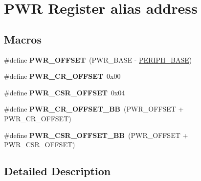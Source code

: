 \hypertarget{group___p_w_r__register__alias__address}{}\section{P\+WR Register alias address}
\label{group___p_w_r__register__alias__address}
\subsection*{Macros}
\begin{DoxyCompactItemize}
\item 
\#define {\bfseries P\+W\+R\+\_\+\+O\+F\+F\+S\+ET}~(P\+W\+R\+\_\+\+B\+A\+SE -\/ \hyperlink{group___peripheral__memory__map_ga9171f49478fa86d932f89e78e73b88b0}{P\+E\+R\+I\+P\+H\+\_\+\+B\+A\+SE})\hypertarget{group___p_w_r__register__alias__address_ga7f88bce73931300319824f22578f90de}{}\label{group___p_w_r__register__alias__address_ga7f88bce73931300319824f22578f90de}

\item 
\#define {\bfseries P\+W\+R\+\_\+\+C\+R\+\_\+\+O\+F\+F\+S\+ET}~0x00\hypertarget{group___p_w_r__register__alias__address_gafc4a9746ee5df183f01c6c9b2b193bf8}{}\label{group___p_w_r__register__alias__address_gafc4a9746ee5df183f01c6c9b2b193bf8}

\item 
\#define {\bfseries P\+W\+R\+\_\+\+C\+S\+R\+\_\+\+O\+F\+F\+S\+ET}~0x04\hypertarget{group___p_w_r__register__alias__address_ga5108a7917314663531d70bdf05ea2698}{}\label{group___p_w_r__register__alias__address_ga5108a7917314663531d70bdf05ea2698}

\item 
\#define {\bfseries P\+W\+R\+\_\+\+C\+R\+\_\+\+O\+F\+F\+S\+E\+T\+\_\+\+BB}~(P\+W\+R\+\_\+\+O\+F\+F\+S\+ET + P\+W\+R\+\_\+\+C\+R\+\_\+\+O\+F\+F\+S\+ET)\hypertarget{group___p_w_r__register__alias__address_ga387e4e883d6bea5c2223adc42ee72daa}{}\label{group___p_w_r__register__alias__address_ga387e4e883d6bea5c2223adc42ee72daa}

\item 
\#define {\bfseries P\+W\+R\+\_\+\+C\+S\+R\+\_\+\+O\+F\+F\+S\+E\+T\+\_\+\+BB}~(P\+W\+R\+\_\+\+O\+F\+F\+S\+ET + P\+W\+R\+\_\+\+C\+S\+R\+\_\+\+O\+F\+F\+S\+ET)\hypertarget{group___p_w_r__register__alias__address_gaa9477acfcacc4610533df164c94ad6fd}{}\label{group___p_w_r__register__alias__address_gaa9477acfcacc4610533df164c94ad6fd}

\end{DoxyCompactItemize}


\subsection{Detailed Description}
